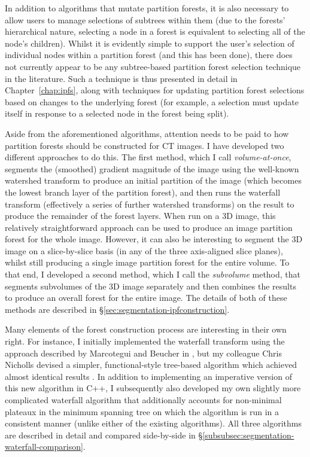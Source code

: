 In addition to algorithms that mutate partition forests, it is also necessary to allow users to manage selections of subtrees within them (due to the forests' hierarchical nature, selecting a node in a forest is equivalent to selecting all of the node's children). Whilst it is evidently simple to support the user's selection of individual nodes within a partition forest (and this has been done), there does not currently appear to be any subtree-based partition forest selection technique in the literature. Such a technique is thus presented in detail in Chapter~\ref{chap:ipfs}, along with techniques for updating partition forest selections based on changes to the underlying forest (for example, a selection must update itself in response to a selected node in the forest being split).

Aside from the aforementioned algorithms, attention needs to be paid to how partition forests should be constructed for CT images. I have developed two different approaches to do this. The first method, which I call \emph{volume-at-once}, segments the (smoothed) gradient magnitude of the image using the well-known watershed transform \cite{beucher90} to produce an initial partition of the image (which becomes the lowest branch layer of the partition forest), and then runs the waterfall transform \cite{marcotegui05} (effectively a series of further watershed transforms) on the result to produce the remainder of the forest layers. When run on a 3D image, this relatively straightforward approach can be used to produce an image partition forest for the whole image. However, it can also be interesting to segment the 3D image on a slice-by-slice basis (in any of the three axis-aligned slice planes), whilst still producing a single image partition forest for the entire volume. To that end, I developed a second method, which I call the \emph{subvolume} method, that segments subvolumes of the 3D image separately and then combines the results to produce an overall forest for the entire image. The details of both of these methods are described in \S\ref{sec:segmentation-ipfconstruction}.

Many elements of the forest construction process are interesting in their own right. For instance, I initially implemented the waterfall transform using the approach described by Marcotegui and Beucher in \cite{marcotegui05}, but my colleague Chris Nicholls devised a simpler, functional-style tree-based algorithm which achieved almost identical results \cite{nicholls09}. In addition to implementing an imperative version of this new algorithm in C++, I subsequently also developed my own slightly more complicated waterfall algorithm that additionally accounts for non-minimal plateaux in the minimum spanning tree on which the algorithm is run in a consistent manner (unlike either of the existing algorithms). All three algorithms are described in detail and compared side-by-side in \S\ref{subsubsec:segmentation-waterfall-comparison}.

